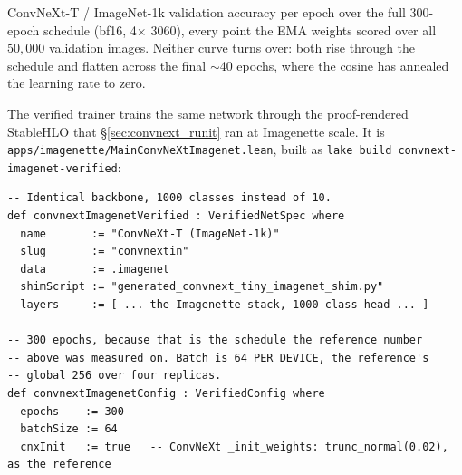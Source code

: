 \begin{center}
\end{center}

\noindent ConvNeXt-T / ImageNet-1k validation accuracy per epoch over the
full 300-epoch schedule (bf16, 4$\times$ 3060), every point the EMA weights
scored over all $50{,}000$ validation images. Neither curve turns over:
both rise through the schedule and flatten across the final $\sim$40
epochs, where the cosine has annealed the learning rate to zero.

\label{sec:convnext_phase4}

The verified trainer trains the same network through the proof-rendered
StableHLO that \S\ref{sec:convnext_runit} ran at Imagenette scale. It is
\texttt{apps/imagenette/MainConvNeXtImagenet.lean}, built as
\texttt{lake build convnext-imagenet-verified}:

\begin{verbatim}
-- Identical backbone, 1000 classes instead of 10.
def convnextImagenetVerified : VerifiedNetSpec where
  name       := "ConvNeXt-T (ImageNet-1k)"
  slug       := "convnextin"
  data       := .imagenet
  shimScript := "generated_convnext_tiny_imagenet_shim.py"
  layers     := [ ... the Imagenette stack, 1000-class head ... ]

-- 300 epochs, because that is the schedule the reference number
-- above was measured on. Batch is 64 PER DEVICE, the reference's
-- global 256 over four replicas.
def convnextImagenetConfig : VerifiedConfig where
  epochs    := 300
  batchSize := 64
  cnxInit   := true   -- ConvNeXt _init_weights: trunc_normal(0.02), as the reference
\end{verbatim}

